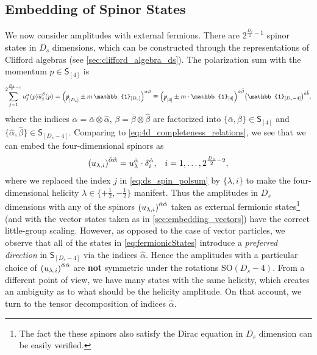 \subsection{Embedding of Spinor States}
\label{sec:embedding_spinors}

We now consider amplitudes with external fermions.
There are $2^{\frac{D_s}{2}-1}$ spinor states in $D_s$ dimensions, 
which can be constructed through the representations of Clifford algebras (see \cref{sec:clifford_algebra_ds}).
The polarization sum with the momentum $p \in \mathsf{S}_{[4]}$ is
\begin{equation} \label{eq:ds_spin_polsum}
  \sum_{j=1}^{2^{\frac{D_s}{2}-1}} u^\alpha_j(p){\overline{u}_j^\beta}(p) = \qty(\slashed{p}_{[D_s]}  \pm m\,\mathbb{1}_{[D_s]})^{\alpha\beta} \equiv 
  \qty(\slashed{p}_{[4]} \pm m \cdot \mathbb{1}_{[4]})^{\bar{\alpha}\bar{\beta}} \qty(\mathbb{1}_{[D_s-4]})^{\hat{a}\hat{b}},
\end{equation}
where the indices $\alpha = \bar{\alpha}\otimes\hat{\alpha}$,  $\beta = \bar{\beta}\otimes \hat{\beta}$ are factorized into 
$\{\bar{\alpha},\bar{\beta}\}\in \mathsf{S}_{[4]}$ and $\{\hat{\alpha},\hat{\beta}\}\in \mathsf{S}_{[D_s-4]}$.
Comparing to \cref{eq:4d_completeness_relations}, we see that we can embed the four-dimensional spinors as
\begin{align} \label{eq:fermionicStates}
    \qty(u_{\lambda,i})^{\bar{\alpha}\hat{\alpha}} =  u_{\lambda}^{\bar{\alpha}} \cdot \delta_i^{\hat{\alpha}}, && i = 1,\ldots{},2^{\frac{D_s}{2}-2},
\end{align}
where we replaced the index $j$ in \cref{eq:ds_spin_polsum} by $\{\lambda, i \}$ to make the four-dimensional helicity $\lambda \in  \{+\frac{1}{2},-\frac{1}{2}\}$ manifest.
Thus the amplitudes in $D_s$ dimensions with any of the spinors $\qty(u_{\lambda,i})^{\bar{\alpha}\hat{\alpha}}$ taken as external fermionic states\footnote{
  The fact the these spinors also satisfy the Dirac equation in $D_s$ dimension can be easily verified.
}
(and with the vector states taken as in \cref{sec:embedding_vectors}) have the correct little-group scaling.
However, as opposed to the case of vector particles, we observe that 
all of the states in \cref{eq:fermionicStates} introduce a \emph{preferred direction} in  $\mathsf{S}_{[D_s-4]}$
via the indices $\hat{\alpha}$.
Hence the amplitudes with a particular choice of $\qty(u_{\lambda,i})^{\bar{\alpha}\hat{\alpha}}$ are \textbf{not} symmetric under the rotations $\mathrm{SO}(D_s-4)$.
From a different point of view, we have many states with the same helicity, which creates an ambiguity as to what 
should be the helicity amplitude.
On that account, we turn to the tensor decomposition of indices $\hat{\alpha}$.


